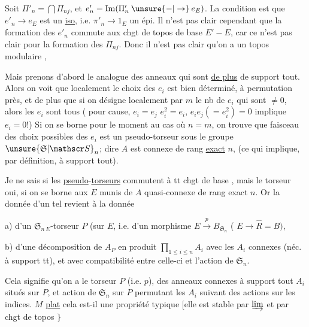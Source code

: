 Soit $\Pi'_n=\bigcap\Pi_{nj}$, et $e'_n=\operatorname{Im}(\Pi'_n\mathbin{\unsure{-|\to}}e_E)$. La condition est que $e'_n\to e_E$ est un \uline{iso}, i.e. $\pi'_n\to 1_E$ un épi. Il n'est pas clair cependant que la formation des $e'_n$ commute aux chgt de topos de base $E'\mathbin{-}E$, car ce n'est pas clair pour la formation des $\Pi_{nj}$. Donc il n'est pas clair qu'on a un topos modulaire ,

Mais prenons d'abord le  analogue des anneaux qui sont \uline{de plus} de support tout.
Alors on voit que localement le choix des $e_i$ est bien déterminé,  à permutation près, et de plus que si  on désigne localement par $m$ le nb de $e_i$ qui sont $\ne 0$, alors  les $e_i$ sont tous   ( pour cause, $e_i=e_j$  $e_i^2=e_i$, $e_i e_j(=e_i^2)=0$ implique $e_i=0$!) Si on se borne pour le moment au cas où $n=m$, on trouve que   faisceau des choix possibles des  $e_i$ est un pseudo-torseur  sous le groupe  $\unsure{\mathfrak S|\mathscr S}_n$; dire   $A$ est  connexe de rang \uline{exact} $n$, (ce qui implique, par définition, à support  tout). 

Je ne sais si les \uline{pseudo}-\uline{torseurs} commutent à tt chgt de base , mais le torseur oui, si on se borne aux $E$ munis de $A$ quasi-connexe de rang exact $n$. Or la donnée d'un tel revient à la donnée

a) d'un $\mathfrak S_{n\,E}$-torseur $P$ (sur $E$, i.e. d'un morphisme $E\xrightarrow{p}B_{\mathfrak S_n}$ ( $E\to\widehat R=B)$,

b) d'une décomposition de $A_P$ en produit $\prod_{1\le i\le n} A_i$ avec les $A_i$ connexes (néc. à support tt), et avec compatibilité entre celle-ci et l'action de $\mathfrak S_n$.

Cela signifie qu'on a le torseur $P$ (i.e. $p$), des anneaux connexes  à support tout $A_i$ situés sur $P$, et  action de $\mathfrak S_n$ sur $P$ permutant  les $A_i$ suivant des actions sur les indices.
$M$ \uline{plat} cela est-il une propriété typique [elle est stable par $\varinjlim$  et par chgt de topos $\}$

